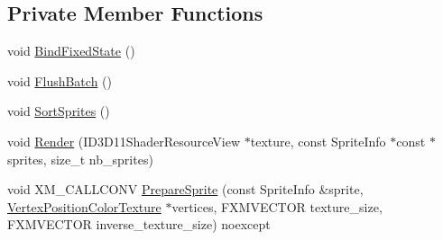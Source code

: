\subsection*{Private Member Functions}
\begin{DoxyCompactItemize}
\item 
void \hyperlink{classmage_1_1rendering_1_1_sprite_batch_1_1_impl_ab07518664c50c9ddd08eb484bc0df0e0}{Bind\+Fixed\+State} ()
\item 
void \hyperlink{classmage_1_1rendering_1_1_sprite_batch_1_1_impl_a65afd35385400d629abc9f60adfadeff}{Flush\+Batch} ()
\item 
void \hyperlink{classmage_1_1rendering_1_1_sprite_batch_1_1_impl_a2573f39b9f7f87b2acd7eadc348c1e2b}{Sort\+Sprites} ()
\item 
void \hyperlink{classmage_1_1rendering_1_1_sprite_batch_1_1_impl_af66d8d8d75a33ea8291d81400f4a47b6}{Render} (I\+D3\+D11\+Shader\+Resource\+View $\ast$texture, const Sprite\+Info $\ast$const $\ast$sprites, size\+\_\+t nb\+\_\+sprites)
\item 
void X\+M\+\_\+\+C\+A\+L\+L\+C\+O\+NV \hyperlink{classmage_1_1rendering_1_1_sprite_batch_1_1_impl_adce1a1942833a97fb14a20bc4add8c31}{Prepare\+Sprite} (const Sprite\+Info \&sprite, \hyperlink{structmage_1_1rendering_1_1_vertex_position_color_texture}{Vertex\+Position\+Color\+Texture} $\ast$vertices, F\+X\+M\+V\+E\+C\+T\+OR texture\+\_\+size, F\+X\+M\+V\+E\+C\+T\+OR inverse\+\_\+texture\+\_\+size) noexcept
\end{DoxyCompactItemize}

